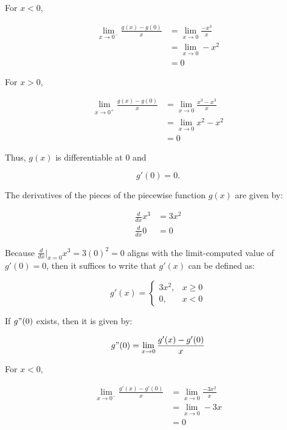 \documentclass{article}
\begin{document}
    For $x<0$,

    \begin{align*}
        \lim_{x\to 0^-} \frac{g(x) - g(0)}{x}   &= \lim_{x\to 0} \frac{-x^3}{x} \\
                                                &= \lim_{x\to 0} -x^2 \\
                                                &= 0
    \end{align*}

    For $x>0$,

    \begin{align*}
        \lim_{x\to 0^+} \frac{g(x) - g(0)}{x}   &= \lim_{x\to 0} \frac{x^3 - x^3}{x} \\
                                                &= \lim_{x\to 0}x^2 - x^2 \\
                                                &= 0
    \end{align*}

    Thus, $g(x)$ is differentiable at 0 and

    \[
        g'(0) = 0.
    \]

    The derivatives of the pieces of the piecewise function $g(x)$ are given by:

    \begin{align*}
        \frac{d}{dx} x^3 &= 3x^2 \\
        \frac{d}{dx} 0   &= 0
    \end{align*}

    Because $\frac{d}{dx}\Big|_{x=0} x^3 = 3(0)^2 = 0$ aligns with the limit-computed value of $g'(0)=0$, then it suffices to write that $g'(x)$ can be defined as:

    \[
        g'(x)   =
        \begin{cases}
            3x^2,   & x \geq 0 \\
            0,      & x < 0
        \end{cases}
    \]

    \pagebreak
    \thispagestyle{page6}

    If $g"(0)$ exists, then it is given by:

    \[
        g"(0) = \lim_{x\to 0} \frac{g'(x) - g'(0)}{x}
    \]

    For $x<0$,

    \begin{align*}
        \lim_{x\to 0^-} \frac{g'(x) - g'(0)}{x}     &= \lim_{x\to 0} \frac{-3x^2}{x} \\
                                                    &= \lim_{x\to 0} -3x \\
                                                    &= 0
    \end{align*}
\end{document}
